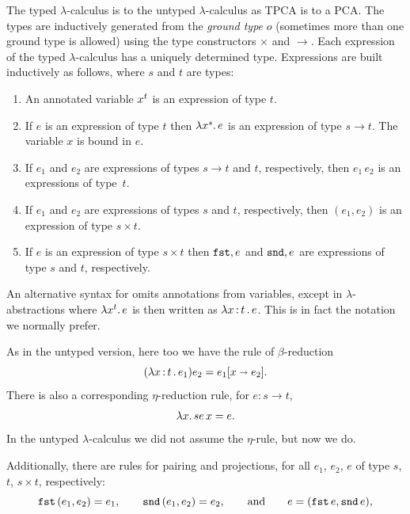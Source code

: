 The typed $\lambda$-calculus is to the untyped $\lambda$-calculus as
TPCA is to a PCA. The types are inductively generated from the
\emph{ground type} $o$ (sometimes more than one ground type is
allowed) using the type constructors $\times$ and $\to$. Each
expression of the typed $\lambda$-calculus has a uniquely
determined type. Expressions are built inductively as follows, where
$s$ and $t$ are types:
%
\begin{enumerate}
\item An annotated variable $x^{t}$ is an expression of type
  $t$.
\item If $e$ is an expression of type $t$ then
  $\lambda x^{s} .\,e$ is an expression of type $s \to t$. The
  variable $x$ is bound in $e$.
\item If $e_1$ and $e_2$ are expressions of types $s \to t$ and
  $t$, respectively, then $e_1\, e_2$ is an expressions of type~$t$.
\item If $e_1$ and $e_2$ are expressions of types $s$ and $t$,
  respectively, then $(e_1, e_2)$ is an expression of type $s \times
  t$.
\item If $e$ is an expression of type $s \times t$ then $\mathtt{fst},e$ and
  $\mathtt{snd},e$ are expressions of type $s$ and $t$, respectively.
\end{enumerate}
%
An alternative syntax for omits annotations from variables, except in
$\lambda$-abstractions where $\lambda x^{t} .\,e$ is then written
as $\lambda x \,{:}\, t\,.\,e$. This is in fact the notation we normally prefer.

As in the untyped version, here too we have the rule of
$\beta$-reduction
%
\begin{equation*}
  (\lambda x \,{:}\, t\,.\,e_1) e_2 = e_1[x \shortrightarrow e_2].
\end{equation*}
%
There is also a corresponding $\eta$-reduction rule, for $e : s \to t$,
%
\begin{equation*}
  \lambda x .\,s{e\,x} = e.
\end{equation*}
%
In the untyped $\lambda$-calculus we did not assume the $\eta$-rule,
but now we do.

Additionally, there are rules for pairing and projections, for all
$e_1$, $e_2$, $e$ of type $s$, $t$, $s \times t$, respectively:
%
\begin{equation*}
  \mathtt{fst}\,(e_1, e_2) = e_1,
  \qquad
  \mathtt{snd}\,(e_1, e_2) = e_2,
  \qquad\text{and}\qquad
  e = (\mathtt{fst}\,e, \mathtt{snd}\,e),
\end{equation*}

